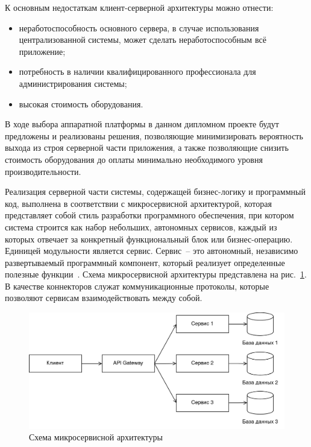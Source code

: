 К основным недостаткам клиент-серверной архитектуры можно отнести:

\begin{itemize}
    \item неработоспособность основного сервера, в случае использования централизованной системы, может сделать неработоспособным всё приложение;
    \item потребность в наличии квалифицированного профессионала для администрирования системы;
    \item высокая стоимость оборудования.
\end{itemize}

В ходе выбора аппаратной платформы в данном дипломном проекте будут предложены и реализованы решения, позволяющие минимизировать вероятность выхода из строя серверной части приложения, а также позволяющие снизить стоимость оборудования до оплаты минимально необходимого уровня производительности.

Реализация серверной части системы, содержащей бизнес-логику и программный код, выполнена в соответствии с микросервисной архитектурой, которая представляет собой стиль разработки программного обеспечения, при котором система строится как набор небольших, автономных сервисов, каждый из которых отвечает за конкретный функциональный блок или бизнес-операцию. Единицей модульности является сервис. Сервис~-- это автономный, независимо развертываемый программный компонент, который реализует определенные полезные функции~\cite{book_microservices_patterns}. Схема микросервисной архитектуры представлена на рис.~\ref{fig:system-design:architectural-pattern-design:microservice-architecture}. В качестве коннекторов служат коммуникационные протоколы, которые позволяют сервисам взаимодействовать между собой.

\begin{figure}[h]
\centering
    \includegraphics[width=0.9\linewidth]{assets/microservice-architecture.png}
    \caption{Схема микросервисной архитектуры}
    \label{fig:system-design:architectural-pattern-design:microservice-architecture}
\end{figure}

